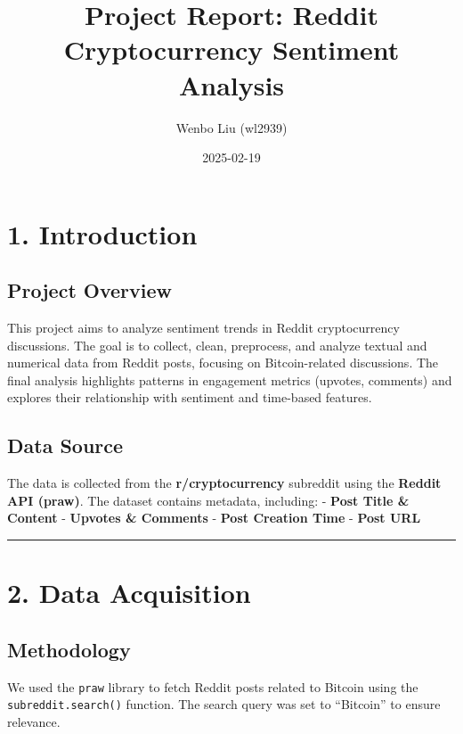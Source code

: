 \documentclass[
  letterpaper,
  DIV=11,
  numbers=noendperiod]{scrartcl}
\title{Project Report: Reddit Cryptocurrency Sentiment Analysis}
\author{Wenbo Liu (wl2939)}
\date{2025-02-19}
\begin{document}
\maketitle

\section{\texorpdfstring{\textbf{1.
Introduction}}{1. Introduction}}\label{introduction}

\subsection{\texorpdfstring{\textbf{Project
Overview}}{Project Overview}}\label{project-overview}

This project aims to analyze sentiment trends in Reddit cryptocurrency
discussions. The goal is to collect, clean, preprocess, and analyze
textual and numerical data from Reddit posts, focusing on
Bitcoin-related discussions. The final analysis highlights patterns in
engagement metrics (upvotes, comments) and explores their relationship
with sentiment and time-based features.

\subsection{\texorpdfstring{\textbf{Data
Source}}{Data Source}}\label{data-source}

The data is collected from the \textbf{r/cryptocurrency} subreddit using
the \textbf{Reddit API (praw)}. The dataset contains metadata,
including: - \textbf{Post Title \& Content} - \textbf{Upvotes \&
Comments} - \textbf{Post Creation Time} - \textbf{Post URL}

\begin{center}\rule{0.5\linewidth}{0.5pt}\end{center}

\section{\texorpdfstring{\textbf{2. Data
Acquisition}}{2. Data Acquisition}}\label{data-acquisition}

\subsection{\texorpdfstring{\textbf{Methodology}}{Methodology}}\label{methodology}

We used the \texttt{praw} library to fetch Reddit posts related to
Bitcoin using the \texttt{subreddit.search()} function. The search query
was set to ``Bitcoin'' to ensure relevance.
\end{document}

